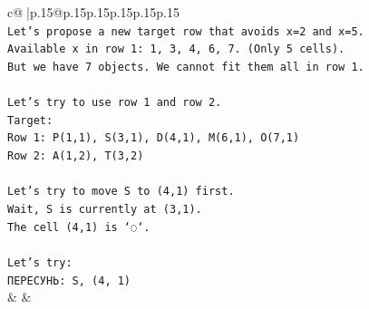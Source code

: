 \documentclass{article}
\begin{document}
{\begin{supertabular}{c@{$\;$}|p{.15\linewidth}@{}p{.15\linewidth}p{.15\linewidth}p{.15\linewidth}p{.15\linewidth}p{.15\linewidth}}
{{{\\ 
\texttt{Let's propose a new target row that avoids x=2 and x=5.} \\
\texttt{Available x in row 1: 1, 3, 4, 6, 7. (Only 5 cells).} \\
\texttt{But we have 7 objects. We cannot fit them all in row 1.} \\
\\ 
\texttt{Let's try to use row 1 and row 2.} \\
\texttt{Target:} \\
\texttt{Row 1: P(1,1), S(3,1), D(4,1), M(6,1), O(7,1)} \\
\texttt{Row 2: A(1,2), T(3,2)} \\
\\ 
\texttt{Let's try to move S to (4,1) first.} \\
\texttt{Wait, S is currently at (3,1).} \\
\texttt{The cell (4,1) is `◌`.} \\
\\ 
\texttt{Let's try:} \\
\texttt{ПЕРЕСУНЬ: S, (4, 1)} \\
            }
        }
    }
    & & \\ \\


\end{supertabular}}
\end{document}
